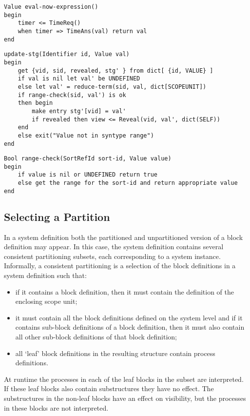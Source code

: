 \begin{verbatim}
Value eval-now-expression()
begin
    timer <= TimeReq()
    when timer => TimeAns(val) return val
end
\end{verbatim}

\begin{verbatim}
update-stg(Identifier id, Value val)
begin
    get {vid, sid, revealed, stg' } from dict[ {id, VALUE} ]
    if val is nil let val' be UNDEFINED
    else let val' = reduce-term(sid, val, dict[SCOPEUNIT])
    if range-check(sid, val') is ok
    then begin
        make entry stg'[vid] = val'
        if revealed then view <= Reveal(vid, val', dict(SELF))
    end
    else exit("Value not in syntype range")
end
\end{verbatim}

\begin{verbatim}
Bool range-check(SortRefId sort-id, Value value)
begin
    if value is nil or UNDEFINED return true
    else get the range for the sort-id and return appropriate value
end
\end{verbatim}

\subsection{Selecting a Partition}

In a system definition both the partitioned and unpartitioned version
of a block definition may appear.
In this case, the system definition
contains several consistent partitioning subsets, each corresponding
to a system instance.
Informally, a consistent partitioning is a
selection of the block definitions in a system definition such that:

\begin{itemize}
\item if it contains a block definition, then it must contain the
definition of the enclosing scope unit;
\item it must contain all the block definitions defined on the system
level and if it contains sub-block definitions of a block definition,
then it must also contain all other sub-block definitions of that
block definition;
\item all `leaf' block definitions in the resulting structure contain
process definitions.
\end{itemize}

At runtime the processes in each of the leaf blocks in the subset are
interpreted. If these leaf blocks also contain substructures they
have no effect. The substructures in the non-leaf blocks have an
effect on visibility, but the processes in these blocks are not
interpreted.

